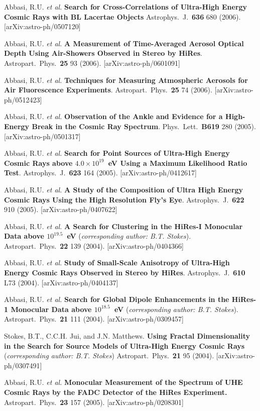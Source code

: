 \begin{resume}
Abbasi, R.U. {\it et al.}  {\bf Search for Cross-Correlations of Ultra-High 
Energy Cosmic Rays with BL Lacertae Objects} Astrophys.\ J.\ {\bf 636} 680 
(2006). 
[arXiv:astro-ph/0507120]

Abbasi, R.U. {\it et al.}  {\bf A Measurement of Time-Averaged Aerosol Optical
Depth Using Air-Showers Observed in Stereo by HiRes}. Astropart.\ Phys.\
{\bf 25} 93 (2006). 
[arXiv:astro-ph/0601091]

Abbasi, R.U. {\it et al.}  {\bf Techniques for Measuring Atmospheric Aerosols 
for Air Fluorescence Experiments}. Astropart.\ Phys.\ {\bf 25} 74 (2006).
[arXiv:astro-ph/0512423]

Abbasi, R.U. {\it et al.}  {\bf Observation of the Ankle and Evidence for a
High-Energy Break in the Cosmic Ray Spectrum}. Phys.\ Lett.\ {\bf B619} 280 
(2005). [arXiv:astro-ph/0501317]

Abbasi, R.U. {\it et al.}  {\bf Search for Point Sources of Ultra-High Energy 
Cosmic Rays above \boldmath$4.0\times 10^{19}$~eV Using a Maximum Likelihood 
Ratio Test}. Astrophys.\ J.\ {\bf 623} 164 (2005).
[arXiv:astro-ph/0412617]

Abbasi, R.U. {\it et al.}  {\bf A Study of the Composition of Ultra High 
Energy Cosmic Rays Using the High Resolution Fly's Eye}.  Astrophys.\ J.\ 
{\bf 622} 910 (2005).
[arXiv:astro-ph/0407622]

Abbasi, R.U. {\it et al.}  {\bf A Search for Clustering in the HiRes-I 
Monocular Data above \boldmath$10^{19.5}$~eV} 
({\it corresponding author: B.T. Stokes}). 
Astropart.\ Phys.\ {\bf 22} 139 (2004). 
[arXiv:astro-ph/0404366]

Abbasi, R.U. {\it et al.}  {\bf Study of Small-Scale Anisotropy of Ultra-High 
Energy Cosmic Rays Observed in Stereo by HiRes}. Astrophys.\ J.\ {\bf 610} L73
(2004). 
[arXiv:astro-ph/0404137]

Abbasi, R.U. {\it et al.}  { \bf Search for Global Dipole Enhancements in the 
HiRes-1 Monocular Data above \boldmath$10^{18.5}$~eV }
({\it corresponding author: B.T. Stokes}).
Astropart.\ Phys.\ {\bf 21} 111 (2004).  
[arXiv:astro-ph/0309457]

Stokes, B.T., C.C.H. Jui, and J.N. Matthews.  {\bf Using Fractal 
Dimensionality in 
the Search for Source Models of Ultra-High Energy Cosmic Rays}
({\it corresponding author: B.T. Stokes})
Astropart.\ Phys.\ {\bf 21} 95 (2004).
[arXiv:astro-ph/0307491]

Abbasi, R.U. {\it et al.}  {\bf  Monocular Measurement of the Spectrum of 
UHE Cosmic Rays by the FADC Detector of the HiRes Experiment.}  
Astropart.\ Phys.\ {\bf 23} 157 (2005).
[arXiv:astro-ph/0208301]  


\end{resume}
